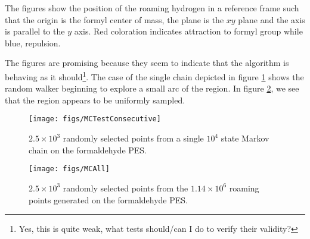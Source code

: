 \documentclass[letterpaper,12pt]{article}
\begin{document}
The figures show the position of the roaming hydrogen in a reference frame such that the origin is the formyl center of mass, the  plane is the $xy$ plane and the  axis is parallel to the $y$ axis. Red coloration indicates attraction to formyl group while blue, repulsion.

The figures are promising because they seem to indicate that the algorithm is behaving as it should\footnote{Yes, this is quite weak, what tests should/can I do to verify their validity?}. The case of the single chain depicted in figure \ref{fig:consec} shows the random walker beginning to explore a small arc of the region. In figure \ref{fig:mcall}, we see that the region appears to be uniformly sampled. 

\begin{figure}[H]
\begin{center}
\texttt{[image: figs/MCTestConsecutive]}
\caption{\label{fig:consec} $2.5 \times 10^3$ randomly selected points from a single $10^4$ state Markov chain on the formaldehyde PES.}
\end{center}
\end{figure}

\begin{figure}[H]
\begin{center}
\texttt{[image: figs/MCAll]}
\caption{\label{fig:mcall} $2.5 \times 10^3$ randomly selected points from the $1.14 \times 10^6$ roaming points generated on the formaldehyde PES.}
\end{center}
\end{figure}



\end{document}
